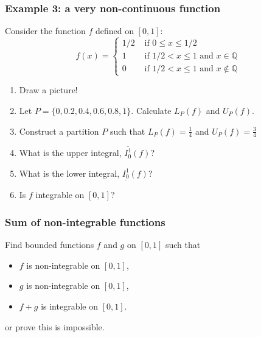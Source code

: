 \documentclass[14pt]{beamer}
\begin{document}
\begin{frame}[t]
	\fontsize{13}{13}\selectfont
	\frametitle{Example 3: a very non-continuous function}

	Consider the function $f$ defined on $[0,1]$:
	\[
		f(x) =
		\begin{cases}
			1/2 & \text{ if } 0 \leq x \leq 1/2                               \\
			1   & \text{ if } 1/2 < x \leq 1 \text{ and } x \in \mathbb{Q}    \\
			0   & \text{ if } 1/2 < x \leq 1 \text{ and } x \notin \mathbb{Q}
		\end{cases}
	\]

	\begin{enumerate}
		\item Draw a picture!

		\item Let $\displaystyle P= \{ 0, 0.2, 0.4, 0.6, 0.8, 1 \}$. Calculate
			$\displaystyle L_{P}(f)$ and $\displaystyle U_{P}(f)$.

		\item Construct a partition $P$ such that $\displaystyle L_{P}(f) = \frac{1}{4}$
			and $\displaystyle U_{P}(f) = \frac{3}{4}$

		\item What is the upper integral, $\overline{I_0^1}(f)$?

		\item What is the lower integral, $\underline{I_0^1}(f)$?

		\item Is $f$ integrable on $[0,1]$?
	\end{enumerate}
\end{frame}

\begin{frame}[t]
	\frametitle{Sum of non-integrable functions}

	Find bounded functions $f$ and $g$ on $[0,1]$ such that
	\begin{itemize}
		\item $f$ is non-integrable on $[0,1]$,

		\item $g$ is non-integrable on $[0,1]$,

		\item $f+g$ is integrable on $[0,1]$.
	\end{itemize}
	or prove this is impossible.
\end{frame}
\end{document}
